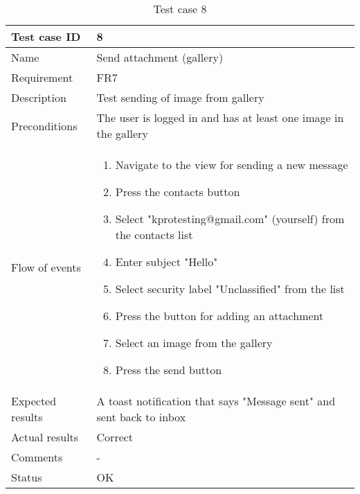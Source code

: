 		\begin{table}[htb]
			\begin{tabular}{l|p{10cm}}
				Test case ID & 8 \\ \hline
				Name & Send attachment (gallery)\\ \hline
				Requirement & FR7\\ \hline
				Description & Test sending of image from gallery\\ \hline
				Preconditions & The user is logged in and has at least one image in the gallery\\ \hline
				Flow of events & 
					\begin{enumerate}
						\item{}Navigate to the view for sending a new message
						\item{}Press the contacts button
						\item{}Select "kprotesting@gmail.com" (yourself) from the contacts list
						\item{}Enter subject "Hello"
						\item{}Select security label "Unclassified" from the list
						\item{}Press the button for adding an attachment
						\item{}Select an image from the gallery
						\item{}Press the send button
					\end{enumerate} \\ \hline
				Expected results & A toast notification that says "Message sent" and sent back to inbox\\ \hline
				Actual results & Correct\\ \hline
				Comments & -\\ \hline
				Status &OK \\ \hline
			\end{tabular}
			\caption{Test case 8} \label{tab:case8}
		\end{table}

